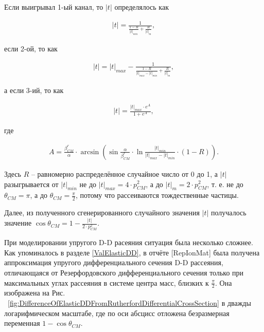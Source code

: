 \documentclass[a4paper,12pt]{article}
\begin{document}
\begin{large}
	Если выигрывал 1-ый канал, то $|t|$ определялось как
	
\begin{equation}
\label{Channel1TEqualParticles}
\begin{aligned} 
  |t| = \frac{1}{ \frac{1-R}{|t|_{min}} + \frac{R}{|t|_m} },
\end{aligned}
\end{equation}

	если 2-ой, то как
	
\begin{equation}
\label{Channel2TEqualParticles}
\begin{aligned} 
  |t| = |t|_{max} - \frac{1}{ \frac{1-R}{|t|_{max}-|t|_{min}} + \frac{R}{|t|_m} },
\end{aligned}
\end{equation}

	а если 3-ий, то как
	
\begin{equation}
\label{Channel3TEqualParticles}
\begin{aligned} 
  |t| = \frac{ |t|_{max} \cdot e^A}{1+e^A},
\end{aligned}
\end{equation}

	где
	
\begin{equation}
\label{Channel3TEqualParticlesA}
\begin{aligned} 
  A = \frac{ \beta^r_{CM} }{\alpha} \cdot \arcsin{ \left( \sin{ \frac{\alpha}{\beta^r_{CM}} \cdot \ln{ \frac{|t|_{min}}{|t|_{max}-|t|_{min}} } } \cdot \left( 1-R \right) \right) }.
\end{aligned}
\end{equation}

	Здесь $R$ -- равномерно распределённое случайное число от 0 до 1, а $|t|$ разыгрывается от $|t|_{min}$ не до $|t|_{max}=4\cdot p^2_{CM}$, а до $|t|_m=2\cdot p^2_{CM}$, т. е. не до $\theta_{CM}=\pi$, а до $\theta_{CM}=\frac{\pi}{2}$, потому что рассеиваются тождественные частицы.
	
	Далее, из полученного сгенерированного случайного значения $|t|$ получалось значение $\cos{ \theta_{CM} }=1-\frac{|t|}{2\cdot p^2_{CM}}$.
	
	При моделировании упругого D-D расеяния ситуация была несколько сложнее.
	Как упоминалось в разделе \ref{ValElasticDD}, в отчёте [RepIonMat] была получена аппроксимация упругого дифференциального сечения D-D рассеяния, отличающаяся от Резерфордовского дифференциального сечения только при максимальных углах рассеяния в системе центра масс, близких к $\frac{\pi}{2}$.
	Она изображена на Рис. ~\ref{fig:DifferenceOfElasticDDFromRutherfordDifferentialCrossSection} в дважды логарифмическом масштабе, где по оси абсцисс отложена безразмерная переменная $1-\cos{ \theta_{CM}}$.
	

\end{large}
\end{document}
